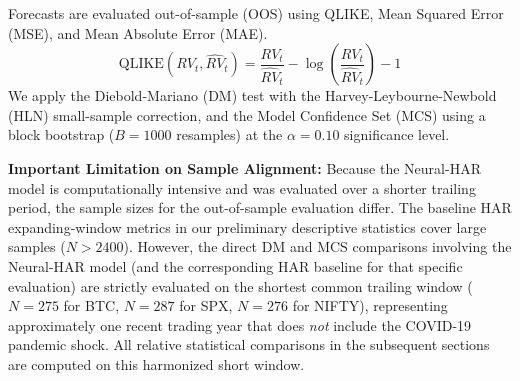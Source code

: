 Forecasts are evaluated out-of-sample (OOS) using QLIKE, Mean Squared Error (MSE), and Mean Absolute Error (MAE). 
\begin{equation}
\text{QLIKE}(RV_t, \widehat{RV}_t) = \frac{RV_t}{\widehat{RV}_t} - \log\left(\frac{RV_t}{\widehat{RV}_t}\right) - 1
\end{equation}
We apply the Diebold-Mariano (DM) test with the Harvey-Leybourne-Newbold (HLN) small-sample correction, and the Model Confidence Set (MCS) using a block bootstrap ($B=1000$ resamples) at the $\alpha=0.10$ significance level.

\textbf{Important Limitation on Sample Alignment:} Because the Neural-HAR model is computationally intensive and was evaluated over a shorter trailing period, the sample sizes for the out-of-sample evaluation differ. The baseline HAR expanding-window metrics in our preliminary descriptive statistics cover large samples ($N > 2400$). However, the direct DM and MCS comparisons involving the Neural-HAR model (and the corresponding HAR baseline for that specific evaluation) are strictly evaluated on the shortest common trailing window ($N=275$ for BTC, $N=287$ for SPX, $N=276$ for NIFTY), representing approximately one recent trading year that does \textit{not} include the COVID-19 pandemic shock. All relative statistical comparisons in the subsequent sections are computed on this harmonized short window.
